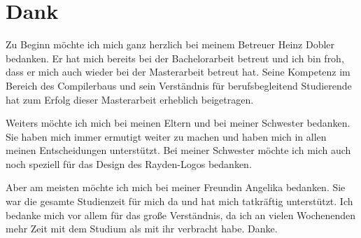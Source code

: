 \chapter{Dank}

Zu Beginn möchte ich mich ganz herzlich bei meinem Betreuer Heinz Dobler bedanken. Er hat mich bereits bei der Bachelorarbeit betreut und ich bin froh, dass er mich auch wieder bei der Masterarbeit betreut hat. Seine Kompetenz im Bereich des Compilerbaus und sein Verständnis für berufsbegleitend Studierende hat zum Erfolg dieser Masterarbeit erheblich beigetragen. 

\SuperPar
Weiters möchte ich mich bei meinen Eltern und bei meiner Schwester bedanken. Sie haben mich immer ermutigt weiter zu machen und haben mich in allen meinen Entscheidungen unterstützt. Bei meiner Schwester möchte ich mich auch noch speziell für das Design des Rayden-Logos bedanken.

\SuperPar
Aber am meisten möchte ich mich bei meiner Freundin Angelika bedanken. Sie war die gesamte Studienzeit für mich da und hat mich tatkräftig unterstützt. Ich bedanke mich vor allem für das große Verständnis, da ich an vielen Wochenenden mehr Zeit mit dem Studium als mit ihr verbracht habe. Danke.
